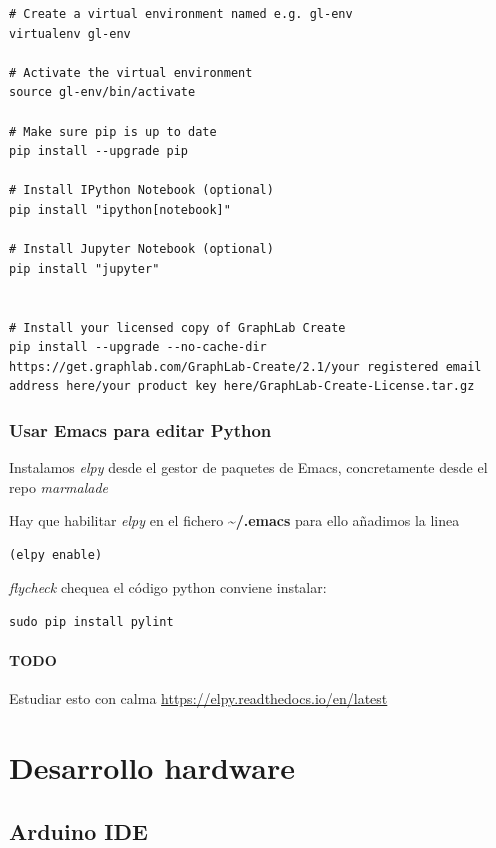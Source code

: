 \documentclass[12pt,spanish,]{article}
\let\oldparagraph\paragraph
\renewcommand{\paragraph}[1]{\oldparagraph{#1}\mbox{}}
\begin{document}
\begin{verbatim}
# Create a virtual environment named e.g. gl-env
virtualenv gl-env

# Activate the virtual environment
source gl-env/bin/activate

# Make sure pip is up to date
pip install --upgrade pip

# Install IPython Notebook (optional)
pip install "ipython[notebook]"

# Install Jupyter Notebook (optional)
pip install "jupyter"


# Install your licensed copy of GraphLab Create
pip install --upgrade --no-cache-dir https://get.graphlab.com/GraphLab-Create/2.1/your registered email address here/your product key here/GraphLab-Create-License.tar.gz
\end{verbatim}

\subsubsection{Usar Emacs para editar
Python}\label{usar-emacs-para-editar-python}

Instalamos \emph{elpy} desde el gestor de paquetes de Emacs,
concretamente desde el repo \emph{marmalade}

Hay que habilitar \emph{elpy} en el fichero
\textbf{\textasciitilde{}/.emacs} para ello añadimos la linea

\begin{verbatim}
(elpy enable)
\end{verbatim}

\emph{flycheck} chequea el código python conviene instalar:

\begin{verbatim}
sudo pip install pylint
\end{verbatim}

\paragraph{TODO}\label{todo}

Estudiar esto con calma \url{https://elpy.readthedocs.io/en/latest}

\section{Desarrollo hardware}\label{desarrollo-hardware}

\subsection{Arduino IDE}\label{arduino-ide}
\end{document}
